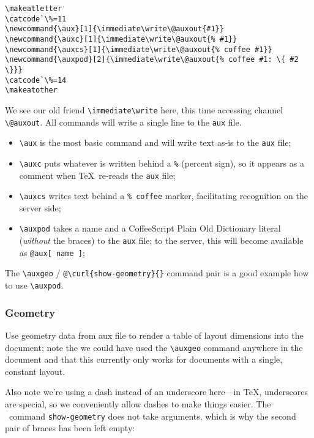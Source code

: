 \begin{verbatim}
\makeatletter
\catcode`\%=11
\newcommand{\aux}[1]{\immediate\write\@auxout{#1}}
\newcommand{\auxc}[1]{\immediate\write\@auxout{% #1}}
\newcommand{\auxcs}[1]{\immediate\write\@auxout{% coffee #1}}
\newcommand{\auxpod}[2]{\immediate\write\@auxout{% coffee #1: \{ #2 \}}}
\catcode`\%=14
\makeatother
\end{verbatim}

We see our old friend \verb#\immediate\write# here, this time accessing channel \verb#\@auxout#. All commands
will write a single line to the \verb#aux# file.

\begin{itemize}
\item
  \verb#\aux# is the most basic command and will write text as-is to the \verb#aux# file;
\item
  \verb#\auxc# puts whatever is written behind a \verb#%# (percent sign), so it appears as a comment when
  \TeX\ re-reads the \verb#aux# file;
\item
  \verb#\auxcs# writes text behind a \verb#% coffee# marker, facilitating recognition on the server side;
\item
  \verb#\auxpod# takes a name and a CoffeeScript Plain Old Dictionary literal ({\em without} the braces)
  to the \verb#aux# file; to the server, this will become available as \verb#@aux[ name ]#;
\end{itemize}

The \verb#\auxgeo# / \verb#@\curl{show-geometry}{}# command pair is a good example how to use \verb#\auxpod#.


\subsubsection{Geometry}\label{geo}


\auxgeo

Use geometry data from aux file to render a table of layout dimensions into the document;
note the we could have used the \verb#\auxgeo# command anywhere in the document and that
this currently only works for documents with a single, constant layout.

Also note we're using a dash instead of an underscore here---in \TeX, underscores are special, so
we conveniently allow dashes to make things easier. The \CXLTX\ command \verb#show-geometry# does
not take arguments, which is why the second pair of braces has been left empty:

